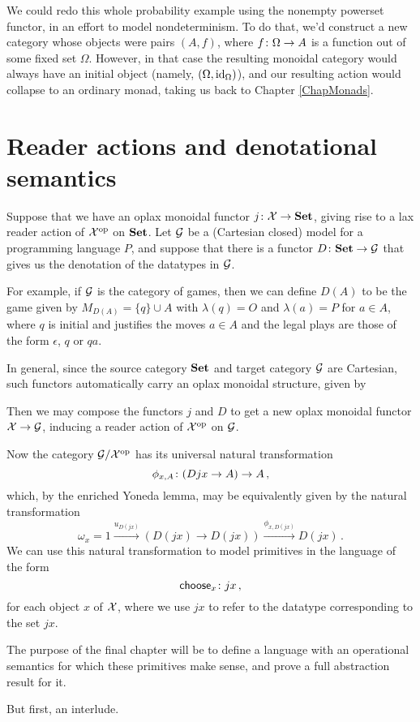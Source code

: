 \begin{remark}
  We could redo this whole probability example using the nonempty powerset functor, in an effort to model nondeterminism. 
  To do that, we'd construct a new category whose objects were pairs $(A,f)$, where $f\colon \Omega \to A$ is a function out of some fixed set $\Omega$.
  However, in that case the resulting monoidal category would always have an initial object (namely, $(\Omega, \operatorname{id}_\Omega)$), and our resulting action would collapse to an ordinary monad, taking us back to Chapter \ref{ChapMonads}.
\end{remark}

\section{Reader actions and denotational semantics}

Suppose that we have an oplax monoidal functor $j \colon \mathcal X \to {\normalfont\textbf{Set}}$, giving rise to a lax reader action of $\mathcal X^{\mathrm{op}}$ on ${\normalfont\textbf{Set}}$.
Let $\mathcal G$ be a (Cartesian closed) model for a programming language $P$, and suppose that there is a functor $D\colon {\normalfont\textbf{Set}} \to \mathcal G$ that gives us the denotation of the datatypes in $\mathcal G$.

For example, if $\mathcal G$ is the category of games, then we can define $D(A)$ to be the game given by $M_{D(A)} = \{q\}\cup A$ with $\lambda(q)=O$ and $\lambda(a)=P$ for $a\in A$, where $q$ is initial and justifies the moves $a\in A$ and the legal plays are those of the form $\epsilon$, $q$ or $qa$.

In general, since the source category ${\normalfont\textbf{Set}}$ and target category $\mathcal G$ are Cartesian, such functors automatically carry an oplax monoidal structure, given by

Then we may compose the functors $j$ and $D$ to get a new oplax monoidal functor $\mathcal X \to \mathcal G$, inducing a reader action of $\mathcal X^{\mathrm{op}}$ on $\mathcal G$.

Now the category $\mathcal G/\mathcal X^{\mathrm{op}}$ has its universal natural transformation
\[
  \phi_{x,A} \colon (Djx \to A) \to A\,,
  \]
which, by the enriched Yoneda lemma, may be equivalently given by the natural transformation
\[
  \omega_x = 1 \xrightarrow{u_{D(jx)}} (D(jx) \to D(jx)) \xrightarrow{\phi_{x,D(jx)}} D(jx)\,.
  \]
We can use this natural transformation to model primitives in the language of the form
\[
  \operatorname{\mathsf{choose}}_x \colon jx\,,
  \]
for each object $x$ of $\mathcal X$, where we use $jx$ to refer to the datatype corresponding to the set $jx$.

The purpose of the final chapter will be to define a language with an operational semantics for which these primitives make sense, and prove a full abstraction result for it.

But first, an interlude.
